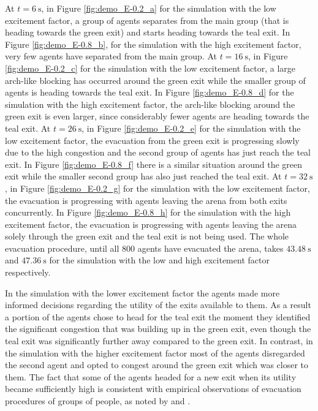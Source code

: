 At $t=\SI{6}{\second}$, in Figure \ref{fig:demo_E-0.2_a} for the simulation with the low excitement factor, a group of agents separates from the main group (that is heading towards the green exit) and starts heading towards the teal exit. In Figure \ref{fig:demo_E-0.8_b}, for the simulation with the high excitement factor, very few agents have separated from the main group. At $t=\SI{16}{\second}$, in Figure \ref{fig:demo_E-0.2_c} for the simulation with the low excitement factor, a large arch-like blocking has occurred around the green exit while the smaller group of agents is heading towards the teal exit. In Figure \ref{fig:demo_E-0.8_d} for the simulation with the high excitement factor, the arch-like blocking around the green exit is even larger, since considerably fewer agents are heading towards the teal exit. At $t=\SI{26}{\second}$, in Figure \ref{fig:demo_E-0.2_e} for the simulation with the low excitement factor, the evacuation from the green exit is progressing slowly due to the high congestion and the second group of agents has just reach the teal exit. In Figure \ref{fig:demo_E-0.8_f} there is a similar situation around the green exit while the smaller second group has also just reached the teal exit. At $t=\SI{32}{\second}$, in Figure \ref{fig:demo_E-0.2_g} for the simulation with the low excitement factor, the evacuation is progressing with agents leaving the arena from both exits concurrently. In Figure \ref{fig:demo_E-0.8_h} for the simulation with the high excitement factor, the evacuation is progressing with agents leaving the arena solely through the green exit and the teal exit is not being used. The whole evacuation procedure, until all $800$ agents have evacuated the arena, takes $\SI{43.48}{\second}$ and $\SI{47.36}{\second}$ for the simulation with the low and high excitement factor respectively.

In the simulation with the lower excitement factor the agents made more informed decisions regarding the utility of the exits available to them. As a result a portion of the agents chose to head for the teal exit the moment they identified the significant congestion that was building up in the green exit, even though the teal exit was significantly further away compared to the green exit. In contrast, in the simulation with the higher excitement factor most of the agents disregarded the second agent and opted to congest around the green exit which was closer to them. The fact that some of the agents headed for a new exit when its utility became sufficiently high is consistent with empirical observations of evacuation procedures of groups of people, as noted by \citet{Helbing1997} and \citet{Seneviratne1985}.
